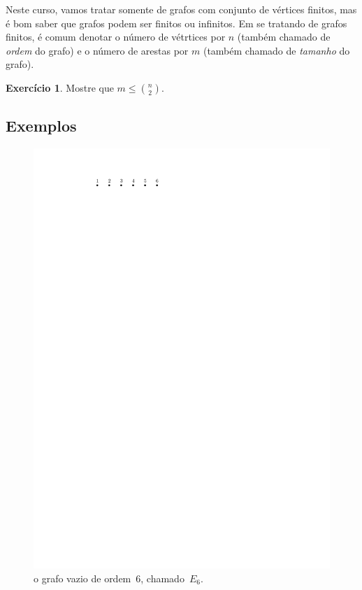 \documentclass[12pt, a4paper]{article}
\theoremstyle{definition}
\newtheorem{exer}{Exercício}
\begin{document}
Neste curso, vamos tratar somente de grafos com conjunto de vértices finitos, mas é bom saber que grafos podem ser finitos ou infinitos. Em se tratando de grafos finitos, é comum denotar o número de vétrtices por $n$ (também chamado de \emph{ordem} do grafo) e o número de arestas por $m$ (também chamado de \emph{tamanho} do grafo). 

\begin{exer}
Mostre que $m \leq {n \choose 2}$.
\end{exer}

\subsection{Exemplos}

\begin{figure}[H]
    \centering
    \includegraphics{vazio.pdf}
    \caption{o grafo vazio de ordem~$6$, chamado~$E_6$.}
    \label{fig:vazio}
\end{figure}
\end{document}
